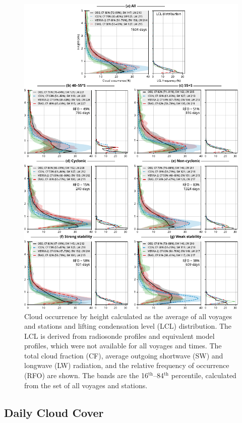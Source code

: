 \documentclass[draft]{agujournal2019}
\begin{document}
\begin{figure}[p!]
\centering
\includegraphics[width=\textwidth]{img/cl_agg_rev1.pdf}
\caption{
Cloud occurrence by height calculated as the average of all voyages and stations and lifting condensation level (LCL) distribution. The LCL is derived from radiosonde profiles and equivalent model profiles, which were not available for all voyages and times. The total cloud fraction (CF), average outgoing shortwave (SW) and longwave (LW) radiation, and the relative frequency of occurrence (RFO) are shown. The bands are the 16$^\mathrm{th}$–84$^\mathrm{th}$ percentile, calculated from the set of all voyages and stations.
}
\label{fig:cloud-occurrence}
\end{figure}

\subsection{Daily Cloud Cover}
\label{sec:cloud-cover}
\end{document}
